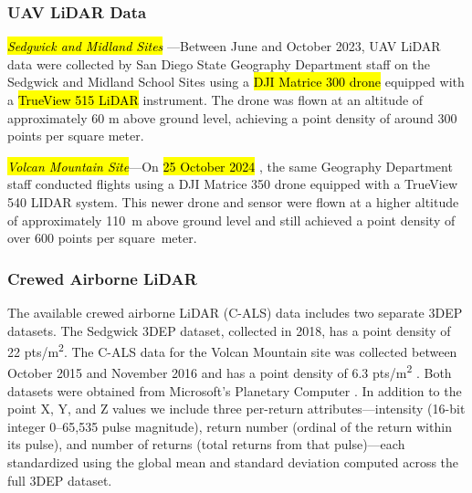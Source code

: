 \documentclass[remotesensing,article,accept,pdftex,moreauthors]{Definitions/mdpi}
\begin{document}
\subsubsection{UAV LiDAR Data}
\textit{\hl{Sedgwick and Midland Sites}%
}---Between June and October 2023, UAV LiDAR data were collected by San Diego State Geography Department staff on the Sedgwick and Midland School Sites using a \hl{DJI Matrice 300 drone} %
 equipped with a \hl{TrueView 515 LiDAR}%
 instrument. The drone was flown at an altitude of approximately 60 m above ground level, achieving a point density of around 300 points per square meter.

\textit{\hl{Volcan Mountain Site}}---On \hl{25 October 2024}%
, the same Geography Department staff conducted flights using a DJI Matrice 350 drone equipped with a TrueView 540 LIDAR system. This newer drone and sensor were flown at a higher altitude of approximately \mbox{110 m} above ground level and still achieved a point density of over 600 points per \mbox{square meter}.

\subsubsection{Crewed Airborne LiDAR}
The available crewed airborne LiDAR (C-ALS) data includes two separate 3DEP datasets. The Sedgwick 3DEP dataset, collected in 2018, has a point density of 22 pts/m\textsuperscript{2}. The C-ALS data for the Volcan Mountain site was collected between October 2015 and November 2016 and has a point density of 6.3 pts/m\textsuperscript{2} \citep{usgs_usgs_2016}. Both datasets were obtained from Microsoft's Planetary Computer \citep{us_geological_survey_3d_elevation_program_usgs_2023,planetary_computer}.
In addition to the point X, Y, and Z values we include three per-return attributes—intensity (16-bit integer 0–65,535 pulse magnitude), return number (ordinal of the return within its pulse), and number of returns (total returns from that pulse)—each standardized using the global mean and standard deviation computed across the full 3DEP dataset.
\end{document}
